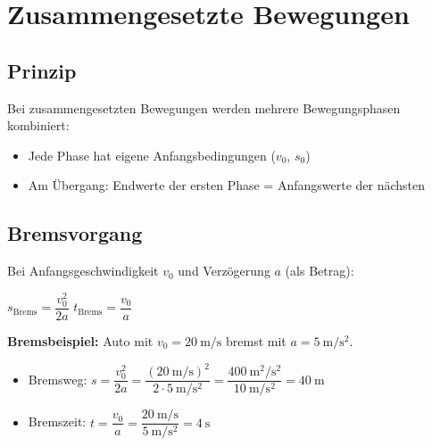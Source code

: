 \documentclass[11pt, a4paper]{article}
\begin{document}
\newpage


\section{Zusammengesetzte Bewegungen}

\subsection{Prinzip}

\begin{merksatz}
Bei zusammengesetzten Bewegungen werden mehrere Bewegungsphasen kombiniert:
\begin{itemize}[leftmargin=1em]
    \item Jede Phase hat eigene Anfangsbedingungen ($v_0$, $s_0$)
    \item Am Übergang: Endwerte der ersten Phase = Anfangswerte der nächsten
\end{itemize}
\end{merksatz}

\subsection{Bremsvorgang}

\begin{formelbox}[title=Bremsweg und Bremszeit]
Bei Anfangsgeschwindigkeit $v_0$ und Verzögerung $a$ (als Betrag):

\begin{center}
{\large $s_{\text{Brems}} = \dfrac{v_0^2}{2a}$ \hspace{3cm} $t_{\text{Brems}} = \dfrac{v_0}{a}$}
\end{center}
\end{formelbox}

\begin{beispielbox}
\textbf{Bremsbeispiel:} Auto mit $v_0 = \SI{20}{\metre\per\second}$ bremst mit $a = \SI{5}{\metre\per\second\squared}$.

\begin{itemize}[leftmargin=1em]
    \item Bremsweg: $s = \dfrac{v_0^2}{2a} = \dfrac{(\SI{20}{\metre\per\second})^2}{2 \cdot \SI{5}{\metre\per\second\squared}} = \dfrac{\SI{400}{\metre\squared\per\second\squared}}{\SI{10}{\metre\per\second\squared}} = \SI{40}{\metre}$
    \item Bremszeit: $t = \dfrac{v_0}{a} = \dfrac{\SI{20}{\metre\per\second}}{\SI{5}{\metre\per\second\squared}} = \SI{4}{\second}$
\end{itemize}
\end{beispielbox}
\end{document}
